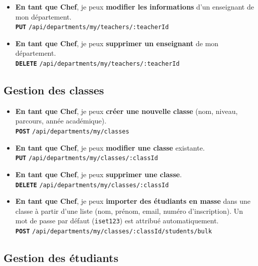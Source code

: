 \documentclass[12pt,a4paper]{article}
\newcommand{\route}[1]{\texorpdfstring{\texttt{\small\color{routeGray}#1}}{#1}}
\newcommand{\httpmethod}[1]{%
  \ifstrequal{#1}{GET}{\colorbox{blue!15}{\texttt{\bfseries\color{blue!70!black}GET}}}{}%
  \ifstrequal{#1}{POST}{\colorbox{green!18}{\texttt{\bfseries\color{green!60!black}POST}}}{}%
  \ifstrequal{#1}{PUT}{\colorbox{orange!18}{\texttt{\bfseries\color{orange!70!black}PUT}}}{}%
  \ifstrequal{#1}{DELETE}{\colorbox{red!15}{\texttt{\bfseries\color{red!70!black}DELETE}}}{}%
}
\newcommand{\usmark}{\color{accentGold}$\blacktriangleright$\;}
\begin{document}
\begin{chefbox}
\begin{itemize}[leftmargin=1.2cm, labelsep=0.4cm]
  \item[\usmark] \textbf{En tant que Chef}, je peux \textbf{modifier les informations} d'un enseignant de mon département.\\
    \httpmethod{PUT} \route{/api/departments/my/teachers/:teacherId}

  \item[\usmark] \textbf{En tant que Chef}, je peux \textbf{supprimer un enseignant} de mon département.\\
    \httpmethod{DELETE} \route{/api/departments/my/teachers/:teacherId}
\end{itemize}

\subsection*{Gestion des classes}

\begin{itemize}[leftmargin=1.2cm, labelsep=0.4cm]
  \item[\usmark] \textbf{En tant que Chef}, je peux \textbf{créer une nouvelle classe} (nom, niveau, parcours, année académique).\\
    \httpmethod{POST} \route{/api/departments/my/classes}

  \item[\usmark] \textbf{En tant que Chef}, je peux \textbf{modifier une classe} existante.\\
    \httpmethod{PUT} \route{/api/departments/my/classes/:classId}

  \item[\usmark] \textbf{En tant que Chef}, je peux \textbf{supprimer une classe}.\\
    \httpmethod{DELETE} \route{/api/departments/my/classes/:classId}

  \item[\usmark] \textbf{En tant que Chef}, je peux \textbf{importer des étudiants en masse} dans une classe à partir d'une liste (nom, prénom, email, numéro d'inscription). Un mot de passe par défaut (\texttt{iset123}) est attribué automatiquement.\\
    \httpmethod{POST} \route{/api/departments/my/classes/:classId/students/bulk}
\end{itemize}

\subsection*{Gestion des étudiants}


\end{chefbox}
\end{document}

